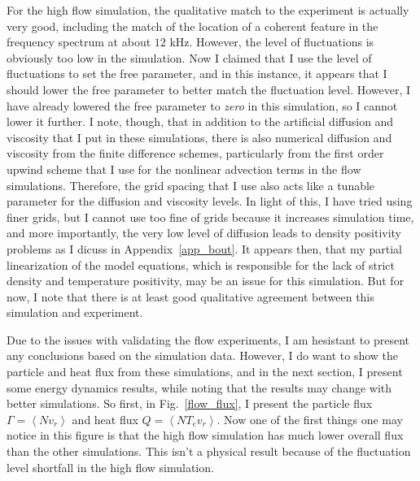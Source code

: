 For the high flow simulation, the qualitative match to the experiment is actually very good, including the match of the location of a coherent feature in the frequency spectrum at about $12$ kHz. 
However, the level of fluctuations is obviously too low in the simulation. Now I claimed that I use
the level of fluctuations to set the free parameter, and in this instance, it appears that I should lower the free parameter to better match the fluctuation level. However, I have already
lowered the free parameter to \emph{zero} in this simulation, so I cannot lower it further. I note, though, that in addition to the artificial diffusion and viscosity that I put in these simulations,
there is also numerical diffusion and viscosity from the finite difference schemes, particularly from the first order upwind scheme that I use for the nonlinear advection terms in the flow
simulations. Therefore, the grid spacing that I use also acts like a tunable parameter for the diffusion and viscosity levels. In light of this, I have tried using finer grids, but I cannot
use too fine of grids because it increases simulation time, and more importantly, the very low level of diffusion leads to density positivity problems as I dicuss in Appendix~\ref{app_bout}.
It appears then, that my partial linearization of the model equations, which is responsible for the lack of strict density and temperature positivity, may be an issue for this simulation.
But for now, I note that there is at least good qualitative agreement between this simulation and experiment.

Due to the issues with validating the flow experiments, I am hesistant to present any conclusions based on the simulation data. However, I do want to show the particle and heat flux from these
simulations, and in the next section, I present some energy dynamics results, while noting that the results may change with better simulations. So first, in Fig.~\ref{flow_flux}, I present
the particle flux $\Gamma = \left< N v_r \right>$ and heat flux $Q = \left< N T_e v_r \right> $. Now one of the first things one may notice in this figure is that the high flow simulation has
much lower overall flux than the other simulations. This isn't a physical result because of the fluctuation level shortfall in the high flow simulation.

